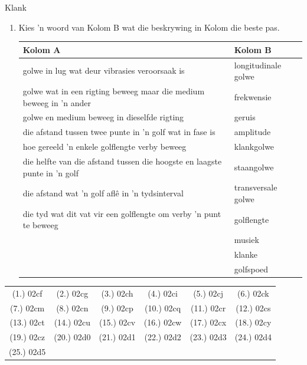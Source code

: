 \begin{eocexercises}{Klank}
\begin{enumerate}[noitemsep, label=\textbf{\arabic*}. ]
\item Kies 'n woord van Kolom B wat die beskrywing in Kolom die beste pas.
\begin{center}
\begin{tabular}{ll}
\textbf{Kolom A} & \textbf{Kolom B} \\ \hline
golwe in lug wat deur vibrasies veroorsaak is & longitudinale golwe \\
golwe wat in een rigting beweeg maar die medium beweeg in 'n ander & frekwensie \\
golwe en medium beweeg in dieselfde rigting  & geruis \\
die afstand tussen twee punte in 'n golf wat in fase is & amplitude \\
hoe gereeld 'n enkele golflengte verby beweeg & klankgolwe \\
die helfte van die afstand tussen die hoogste en laagste punte in 'n golf & staangolwe \\
die afstand wat 'n golf afl\^e in 'n tydsinterval & transversale golwe \\
die tyd wat dit vat vir een golflengte om verby 'n punt te beweeg & golflengte \\
& musiek \\
& klanke \\
& golfspoed \\
\end{tabular}
\end{center}
\end{enumerate}
  \label{m38800**end}
  \label{9b5d72dd5f0585e544578ab90a9956a8**end}
\par \practiceinfo
\par \begin{tabular}[h]{cccccc}
(1.)	02cf	&
(2.)	02cg	&
(3.)	02ch	&
(4.)	02ci	&
(5.)	02cj	&
(6.)	02ck	\\ %
(7.)	02cm	&
(8.)	02cn	&
(9.)	02cp	&
(10.)	02cq	&
(11.)	02cr	&
(12.)	02cs	\\ %
(13.)	02ct	&
(14.)	02cu	&
(15.)	02cv	&
(16.)	02cw	&
(17.)	02cx	&
(18.)	02cy	\\ %
(19.)	02cz	&
(20.)	02d0	&
(21.)	02d1	&
(22.)	02d2	&
(23.)	02d3	&
(24.)	02d4	\\ %
(25.)	02d5	&
\end{tabular}
\end{eocexercises}
